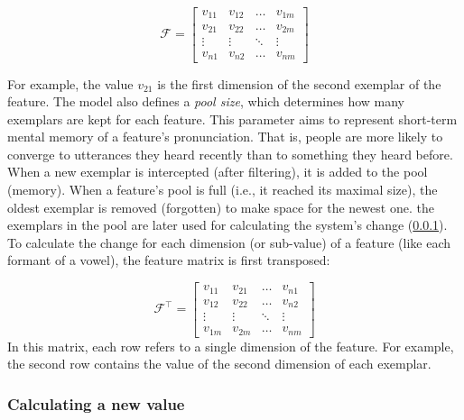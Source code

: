 \begin{equation}
\label{eq:feature_matrix}
\mathcal{F} =
\begin{bmatrix} 
v_{11} & v_{12} & \dots  & v_{1m}\\
v_{21} & v_{22} & \dots  & v_{2m} \\
\vdots & \vdots & \ddots & \vdots \\
v_{n1} & v_{n2} & \dots  & v_{nm} 
\end{bmatrix}
\end{equation}

\noindent
For example, the value $v_{21}$ is the first dimension of the second exemplar of the feature.
The model also defines a \textit{pool size}, which determines how many exemplars are kept for each feature.
This parameter aims to represent short-term mental memory of a feature's pronunciation.
That is, people are more likely to converge to utterances they heard recently than to something they heard before.
When a new exemplar is intercepted (after filtering), it is added to the pool (memory).
When a feature's pool is full (i.e., it reached its maximal size), the oldest exemplar is removed (forgotten) to make space for the newest one.
the exemplars in the pool are later used for calculating the system's change (\cref{subsubsec:calculating_changed_value}).
To calculate the change for each dimension (or sub-value) of a feature (like each formant of a vowel), the feature matrix is first transposed:

\begin{equation}
\label{eq:transposed_feature_matrix}
\textbf{$\mathcal{F}$}^\top =
\begin{bmatrix} 
v_{11} & v_{21} & \dots  & v_{n1}\\
v_{12} & v_{22} & \dots  & v_{n2} \\
\vdots & \vdots & \ddots & \vdots \\
v_{1m} & v_{2m} & \dots  & v_{nm} 
\end{bmatrix}
\end{equation}
\noindent
In this matrix, each row refers to a single dimension of the feature.
For example, the second row contains the value of the second dimension of each exemplar.

\subsubsection{Calculating a new value}
\label{subsubsec:calculating_changed_value}

